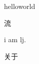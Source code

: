 \documentclass[UTF8]{ctexart}
\begin{document}
    helloworld
    
    流
    
    i am lj.


    关于
\end{document}
